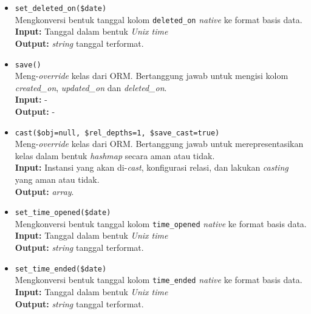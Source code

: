 \begin{itemize}
\begin{itemize}
                \item \texttt{set\_deleted\_on(\$date)} \\
                    Mengkonversi bentuk tanggal kolom \texttt{deleted\_on}
                    \textit{native} ke format basis data. \\
                    \textbf{Input:} Tanggal dalam bentuk \textit{Unix time}\\
                    \textbf{Output:} \textit{string} tanggal terformat.
                    
                \item \texttt{save()}\\
                    Meng-\textit{override} kelas dari ORM. Bertanggung jawab
                    untuk mengisi kolom \textit{created\_on},
                    \textit{updated\_on} dan \textit{deleted\_on}.\\
                    \textbf{Input:} -\\
                    \textbf{Output:} -
                
                \item \texttt{cast(\$obj=null, \$rel\_depths=1,
                \$save\_cast=true)}\\
                    Meng-\textit{override} kelas dari ORM. Bertanggung jawab
                    untuk merepresentasikan kelas dalam bentuk \textit{hashmap}
                    secara aman atau tidak. \\
                    \textbf{Input:} Instansi yang akan di-\textit{cast},
                        konfigurasi relasi, dan lakukan \textit{casting} yang
                        aman atau tidak.\\
                    \textbf{Output:} \textit{array}.
                    
                \item \texttt{set\_time\_opened(\$date)} \\
                     Mengkonversi bentuk tanggal kolom \texttt{time\_opened}
                    \textit{native} ke format basis data. \\
                    \textbf{Input:} Tanggal dalam bentuk \textit{Unix time}\\
                    \textbf{Output:} \textit{string} tanggal terformat.
                
                \item \texttt{set\_time\_ended(\$date)} \\
                    Mengkonversi bentuk tanggal kolom \texttt{time\_ended}
                    \textit{native} ke format basis data. \\
                    \textbf{Input:} Tanggal dalam bentuk \textit{Unix time}\\
                    \textbf{Output:} \textit{string} tanggal terformat.
                

\end{itemize}
\end{itemize}
